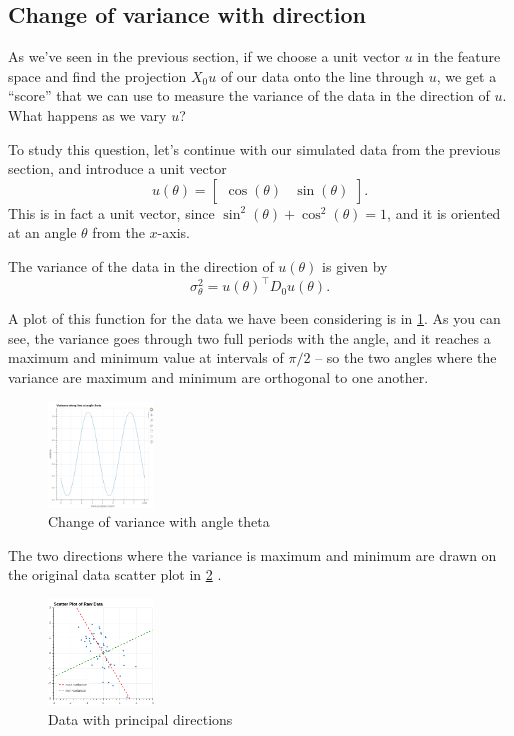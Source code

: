 \documentclass[
  oneside]{scrbook}
\begin{document}
\hypertarget{change-of-variance-with-direction}{%
\subsection{Change of variance with
direction}\label{change-of-variance-with-direction}}

As we've seen in the previous section, if we choose a unit vector \(u\)
in the feature space and find the projection \(X_{0}u\) of our data onto
the line through \(u\), we get a ``score'' that we can use to measure
the variance of the data in the direction of \(u\). What happens as we
vary \(u\)?

To study this question, let's continue with our simulated data from the
previous section, and introduce a unit vector \[
u(\theta) = \left[\begin{matrix} \cos(\theta) & \sin(\theta)\end{matrix}\right].
\] This is in fact a unit vector, since
\(\sin^2(\theta)+\cos^2(\theta)=1\), and it is oriented at an angle
\(\theta\) from the \(x\)-axis.

The variance of the data in the direction of \(u(\theta)\) is given by
\[
\sigma_{\theta}^2 = u(\theta)^{\intercal}D_{0}u(\theta).
\]

A plot of this function for the data we have been considering is in
\cref{fig:pcatheta}. As you can see, the variance goes through two full
periods with the angle, and it reaches a maximum and minimum value at
intervals of \(\pi/2\) -- so the two angles where the variance are
maximum and minimum are orthogonal to one another.

\begin{figure}
\hypertarget{fig:pcatheta}{%
\centering
\includegraphics[width=0.25\textwidth,height=\textheight]{img/PCAtheta.png}
\caption{Change of variance with angle theta}\label{fig:pcatheta}
}
\end{figure}

The two directions where the variance is maximum and minimum are drawn
on the original data scatter plot in \cref{fig:pcaprincipal} .

\begin{figure}
\hypertarget{fig:pcaprincipal}{%
\centering
\includegraphics[width=0.25\textwidth,height=\textheight]{img/PCAprincipal.png}
\caption{Data with principal directions}\label{fig:pcaprincipal}
}
\end{figure}
\end{document}
